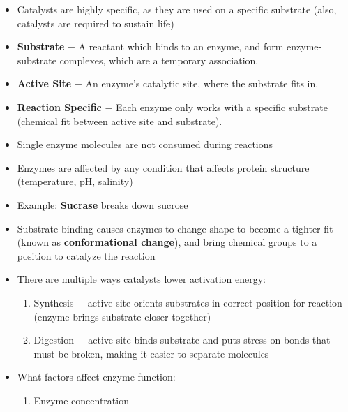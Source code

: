 \documentclass[12pt]{article}
\begin{document}
\begin{itemize}
  \item Catalysts are highly specific, as they are used on a specific substrate (also, catalysts are required to sustain life)

  \item \textbf{Substrate} $-$ A reactant which binds to an enzyme, and form enzyme-substrate complexes, which are a temporary association.

  \item \textbf{Active Site} $-$ An enzyme's catalytic site, where the substrate fits in.

  \item \textbf{Reaction Specific} $-$ Each enzyme only works with a specific substrate (chemical fit between active site and substrate).

  \item Single enzyme molecules are not consumed during reactions

  \item Enzymes are affected by any condition that affects protein structure (temperature, pH, salinity)

  \item Example: \textbf{Sucrase} breaks down sucrose
    
  \item Substrate binding causes enzymes to change shape to become a tighter fit (known as \textbf{conformational change}), and bring chemical groups to a position to catalyze the reaction

  \item There are multiple ways catalysts lower activation energy:

    \begin{enumerate}

      \item Synthesis $-$ active site orients substrates in correct position for reaction (enzyme brings substrate closer together)

      \item Digestion $-$ active site binds substrate and puts stress on bonds that must be broken, making it easier to separate molecules

    \end{enumerate}

  \item What factors affect enzyme function:

    \begin{enumerate}

      \item Enzyme concentration


\end{enumerate}
\end{itemize}
\end{document}
